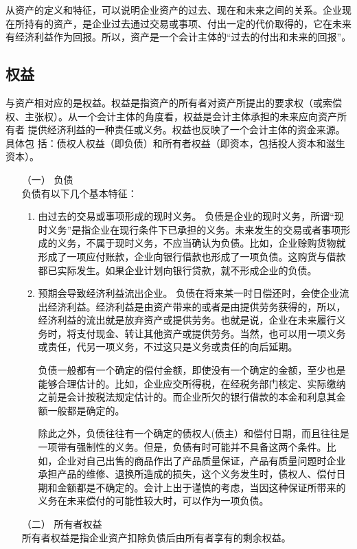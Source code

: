 \begin{enumerate}
					从资产的定义和特征，可以说明企业资产的过去、现在和未来之间的关系。企业现在所持有的资产，是企业过去通过交易或事项、付出一定的代价取得的，它在未来有经济利益作为回报。所以，资产是一个会计主体的“过去的付出和未来的回报”。
			\end{enumerate}

		\subsection{权益}
			与资产相对应的是权益。权益是指资产的所有者对资产所提出的要求权（或索偿 权、主张权）。从一个会计主体的角度看，权益是会计主体承担的未来应向资产所有者 提供经济利益的一种责任或义务。权益也反映了一个会计主体的资金来源。具体包 括：债权人权益（即负债）和所有者权益（即资本，包括投人资本和滋生资本）。

			\begin{enumerate}
				\item[（一）] 负债 \\
					负债有以下几个基本特征：
					\begin{enumerate}
						\item 由过去的交易或事项形成的现时义务。
							负债是企业的现时义务，所谓“现时义务”是指企业在现行条件下已承担的义务。未来发生的交易或者事项形成的义务，不属于现时义务，不应当确认为负债。比如，企业赊购货物就形成了一项应付账款，企业向银行借款也形成了一项负债。这购货与借款都已实际发生。如果企业计划向银行贷款，就不形成企业的负债。
						\item 预期会导致经济利益流出企业。
							负债在将来某一时日偿还时，会使企业流出经济利益。经济利益是由资产带来的或者是由提供劳务获得的，所以，经济利益的流出就是放弃资产或提供劳务。也就是说，企业在未来履行义务时，将支付现金、转让其他资产或提供劳务。当然，也可以用一项义务或责任，代另一项义务，不过这只是义务或责任的向后延期。

							负债一般都有一个确定的偿付金额，即使没有一个确定的金额，至少也是能够合理估计的。比如，企业应交所得税，在经税务部门核定、实际缴纳之前是会计按税法规定估计的。而企业所欠的银行借款的本金和利息其金额一般都是确定的。

							除此之外，负债往往有一个确定的债权人(债主）和偿付日期，而且往往是一项带有强制性的义务。但是，负债有时可能并不具备这两个条件。比如，企业对自己出售的商品作出了产品质量保证，产品有质量问题时企业承担产品的维修、退换所造成的损失，这个义务发生时，债权人、偿付日期和金额都是不确定的。会计上出于谨慎的考虑，当因这种保证所带来的义务在未来偿付的可能性较大时，可以作为一项负债。
					\end{enumerate}
				\item[（二）] 所有者权益 \\
					所有者权益是指企业资产扣除负债后由所有者享有的剩余权益。
					

\end{enumerate}
